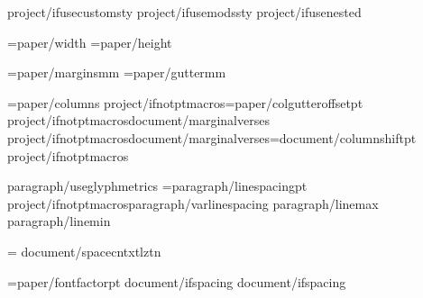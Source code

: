 


{project/ifusecustomsty}
{project/ifusemodssty} %
{project/ifusenested}     %

\PaperWidth={paper/width}
\PaperHeight={paper/height}

\MarginUnit={paper/margins}mm
\def\TopMarginFactor{{{paper/topmarginfactor}}}
\def\BottomMarginFactor{{{paper/bottommarginfactor}}}
\def\SideMarginFactor{{{paper/sidemarginfactor}}}
\BindingGutter={paper/gutter}mm

\BodyColumns={paper/columns}
\def\ColumnGutterFactor{{{document/colgutterfactor}}}
{project/ifnotptmacros}\ColumnGutterRuleSkip={paper/colgutteroffset}pt
{project/ifnotptmacros}{document/marginalverses}
{project/ifnotptmacros}{document/marginalverses}\columnshift={document/columnshift}pt
{project/ifnotptmacros}

\def\LineSpacingFactor{{{paragraph/linespacingfactor}}}
\def\VerticalSpaceFactor{{1.0}}
{paragraph/useglyphmetrics}
\baselineskip={paragraph/linespacing}pt {project/ifnotptmacros}{paragraph/varlinespacing} {paragraph/linemax} {paragraph/linemin}

\XeTeXinterwordspaceshaping = {document/spacecntxtlztn}

\FontSizeUnit={paper/fontfactor}pt
\def\regular{{"{fontregular/name}{fontregular/engine}{font/features}{document/script}{document/digitmapping}"}}
\def\bold{{"{fontbold/name}{fontbold/engine}{font/features}{document/script}{document/digitmapping}{fontbold/embolden}{fontbold/slant}"}}
\def\italic{{"{fontitalic/name}{fontitalic/engine}{font/features}{document/script}{document/digitmapping}{fontitalic/embolden}{fontitalic/slant}"}}
\def\bolditalic{{"{fontbolditalic/name}{fontbolditalic/engine}{font/features}{document/script}{document/digitmapping}{fontbolditalic/embolden}{fontbolditalic/slant}"}}
{document/ifspacing}\def\SpaceStretchFactor{{{document/spacestretch}}}
{document/ifspacing}\def\SpaceShrinkFactor{{{document/spaceshrink}}}

